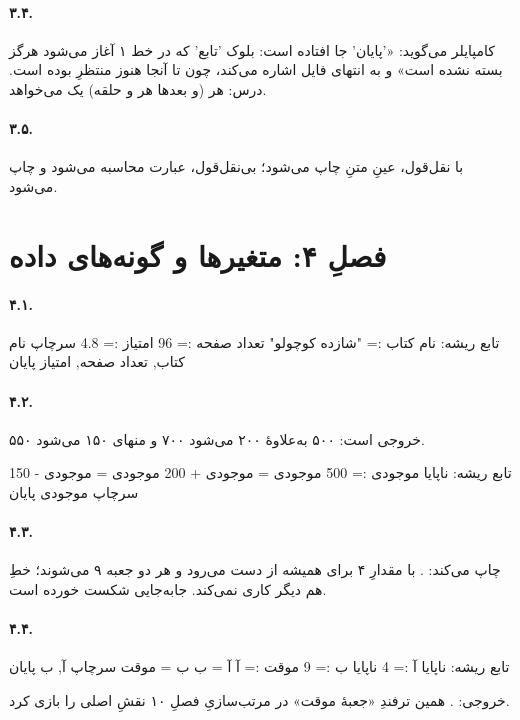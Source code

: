 \paragraph{۳.۴.} کامپایلر می‌گوید:
«'پایان' جا افتاده است: بلوک 'تابع' که در خط ۱ آغاز می‌شود هرگز
بسته نشده است» و به انتهای فایل اشاره می‌کند، چون تا آنجا هنوز منتظرِ
 بوده است. درس: هر  (و بعدها هر  و
حلقه) یک  می‌خواهد.

\paragraph{۳.۵.} با نقل‌قول، عینِ متنِ  چاپ می‌شود؛
بی‌نقل‌قول، عبارت محاسبه می‌شود و  چاپ می‌شود.

\section*{فصلِ ۴: متغیرها و گونه‌های داده}

\paragraph{۴.۱.}
\begin{salamfa}
تابع ریشه:
    نام کتاب := "شازده کوچولو"
    تعداد صفحه := 96
    امتیاز := 4.8
    سرچاپ نام کتاب, تعداد صفحه, امتیاز
پایان
\end{salamfa}

\paragraph{۴.۲.} خروجی  است: ۵۰۰ به‌علاوهٔ ۲۰۰ می‌شود ۷۰۰ و
منهای ۱۵۰ می‌شود ۵۵۰.
\begin{salamfa}
تابع ریشه:
    ناپایا موجودی := 500
    موجودی = موجودی + 200
    موجودی = موجودی - 150
    سرچاپ موجودی
پایان
\end{salamfa}

\paragraph{۴.۳.} چاپ می‌کند: . با  مقدارِ ۴ برای
همیشه از دست می‌رود و هر دو جعبه ۹ می‌شوند؛ خطِ  هم دیگر
کاری نمی‌کند. جابه‌جایی شکست خورده است.

\paragraph{۴.۴.}
\begin{salamfa}
تابع ریشه:
    ناپایا آ := 4
    ناپایا ب := 9
    موقت := آ
    آ = ب
    ب = موقت
    سرچاپ آ, ب
پایان
\end{salamfa}
خروجی: . همین ترفندِ «جعبهٔ موقت» در مرتب‌سازیِ فصلِ ۱۰ نقشِ
اصلی را بازی کرد.

